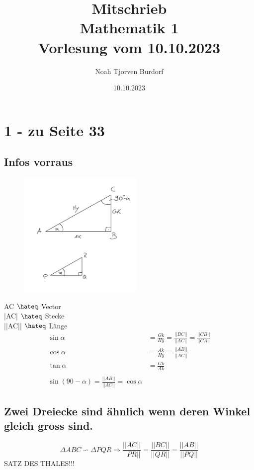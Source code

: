 \documentclass[a4paper,onecolumn,pdftex]{report}
\begin{document}
    \author{Noah Tjorven Burdorf}
    \title{Mitschrieb \\ Mathematik 1 \\ Vorlesung vom 10.10.2023}
    \date{10.10.2023}
    \maketitle

    \section*{1 - zu Seite 33}
    \subsection*{Infos vorraus}
    \begin{figure}
        \includegraphics[width=6cm]{2023-10-10_22h01_07.png}
    \end{figure}
    AC $\hateq$ Vector \\
    |AC| $\hateq$ Stecke \\
    ||AC|| $\hateq$ L\"ange \\
    \begin{align*}
        \sin\alpha&=\frac{Gk}{Hy}=\frac{||BC||}{||AC||}=\frac{||CB||}{||CA||} \\
        \cos\alpha&=\frac{Ak}{Hy}=\frac{||AB||}{||AC||} \\
        \tan\alpha&=\frac{Gk}{Ak} \\\\
        \sin(90-\alpha) = \frac{||AB||}{||AC||} = \cos\alpha
    \end{align*}
    \subsection*{Zwei Dreiecke sind \"ahnlich wenn deren Winkel gleich gross sind.}
    $$\Delta ABC \backsim \Delta PQR \Rightarrow \frac{||AC||}{||PR||}=\frac{||BC||}{||QR||}=\frac{||AB||}{||PQ||}$$
    SATZ DES THALES!!!
\end{document}
